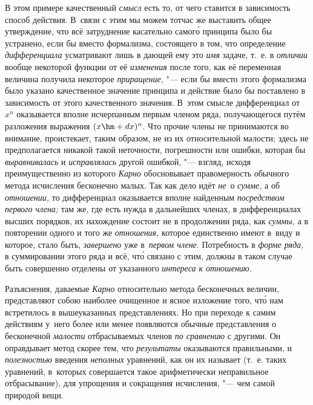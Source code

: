 В этом примере качественный {\em смысл} есть то, от чего ставится в зависимость способ
действия. В~связи с этим мы можем тотчас же выставить общее утверждение, что всё
затруднение касательно самог\'{о} принципа было бы устранено, если бы вместо
формализма, состоящего в том, что определение {\em дифференциала} усматривают
лишь в дающей ему это {\em имя} задаче, т.~е. в {\em отличии} вообще некоторой
функции от её {\em изменения} после того, как её переменная величина получила
некоторое {\em приращение,} "--- если бы вместо этого формализма было указано
качественное значение принципа и действие было бы поставлено в зависимость от
этого качественного значения. В~этом смысле дифференциал от $x^n$ оказывается
вполне исчерпанным первым членом ряда, получающегося путём разложения выражения
$(x\hm+dx)^n$. Что прочие члены не принимаются во внимание, проистекает, таким
образом, не из их относительной малости; здесь не предполагается никакой такой
неточности, погрешности или ошибки, которая бы {\em выравнивалась} и
{\em исправлялась} другой ошибкой, "--- взгляд, исходя преимущественно из
которого {\em Карно} обосновывает правомерность обычного метода исчисления бесконечно малых.
Так как дело идёт {\em не}~о {\em сумме,} а об {\em отношении,}
то дифференциал оказывается вполне найденным {\em посредством первого члена;}
там же, где есть нужда в дальнейших членах, в дифференциалах
высших порядков, их нахождение состоит не в продолжении ряда, как {\em суммы,}
а в повторении одного и того же {\em отношения,} которое единственно имеют
в~виду и которое, стало быть, {\em завершено} уже в~{\em первом члене}.
Потребность в {\em форме ряда,} в суммировании этого ряда и
всё, чт\'{о} связано с этим, должны в таком случае быть совершенно отделены от
указанного {\em интереса к отношению}.

Разъяснения, даваемые {\em Карно} относительно метода бесконечных величин,
представляют собою наиболее очищенное и ясное изложение того, чт\'{о} нам
встретилось в вышеуказанных представлениях. Но при переходе к самим действиям
у~него более или менее появляются обычные представления о бесконечной
{\em малости} отбрасываемых членов {\em по сравнению} с другими. Он
оправдывает метод скорее тем, что {\em результаты} оказываются правильными,
и {\em полезностью} введения {\em неполных} уравнений, как он их называет
(т.~е. таких уравнений, в~которых совершается такое арифметически неправильное
отбрасывание), для упрощения и сокращения исчисления, "--- чем самой
природой вещи.

